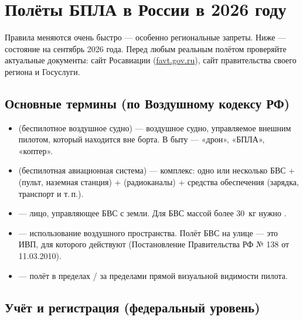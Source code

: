 \section{Полёты БПЛА в России в 2026 году}

\begin{caution}
Правила меняются очень быстро — особенно региональные запреты. Ниже — состояние на сентябрь 2026 года.
Перед любым реальным полётом проверяйте актуальные документы: сайт Росавиации (\url{favt.gov.ru}),
сайт правительства своего региона и Госуслуги.
\end{caution}

\subsection{Основные термины (по Воздушному кодексу РФ)}
\begin{itemize}
\item {} (беспилотное воздушное судно) — воздушное судно, управляемое внешним пилотом, который находится вне борта. В быту — «дрон», «БПЛА», «коптер».
\item {} (беспилотная авиационная система) — комплекс: одно или несколько БВС +  (пульт, наземная станция) +  (радиоканалы) + средства обеспечения (зарядка, транспорт и т.\,п.).
\item {} — лицо, управляющее БВС с земли. Для БВС массой более 30~кг нужно .
\item {} — использование воздушного пространства. Полёт БВС на улице — это ИВП, для которого действуют  (Постановление Правительства РФ № 138 от 11.03.2010).
\item {} — полёт в пределах / за пределами прямой визуальной видимости пилота.
\end{itemize}

\subsection{Учёт и регистрация (федеральный уровень)}

